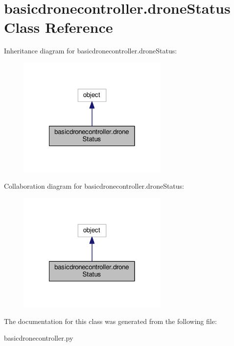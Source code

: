 \hypertarget{classbasicdronecontroller_1_1droneStatus}{\section{basicdronecontroller.\-drone\-Status Class Reference}
\label{classbasicdronecontroller_1_1droneStatus}
}


Inheritance diagram for basicdronecontroller.\-drone\-Status\-:
\nopagebreak
\begin{figure}[H]
\begin{center}
\leavevmode
\includegraphics[width=210pt]{classbasicdronecontroller_1_1droneStatus__inherit__graph}
\end{center}
\end{figure}


Collaboration diagram for basicdronecontroller.\-drone\-Status\-:
\nopagebreak
\begin{figure}[H]
\begin{center}
\leavevmode
\includegraphics[width=210pt]{classbasicdronecontroller_1_1droneStatus__coll__graph}
\end{center}
\end{figure}


The documentation for this class was generated from the following file\-:\begin{DoxyCompactItemize}
\item 
basicdronecontroller.\-py\end{DoxyCompactItemize}
